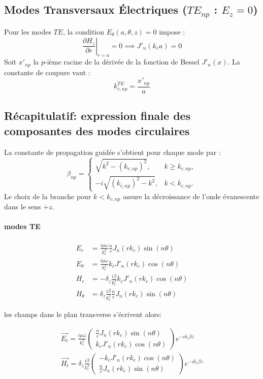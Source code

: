 \documentclass[12pt,a4paper]{report}
\begin{document}
\subsection{Modes Transversaux Électriques ($TE_{np}$ : $E_z = 0$)}
Pour les modes $TE$, la condition $E_\theta(a, \theta, z) = 0$ impose :
\begin{equation}
\left. \frac{\partial H_z}{\partial r} \right|_{r=a} = 0 \implies J'_n(k_c a) = 0
\end{equation}
Soit $x'_{np}$ la $p$-ième racine de la dérivée de la fonction de Bessel $J'_n(x)$. La constante de coupure vaut :
\begin{equation}
k_{c,np}^{TE} = \frac{x'_{np}}{a}
\end{equation}

\subsection{Récapitulatif: expression finale des composantes des modes circulaires}
La constante de propagation guidée s'obtient pour chaque mode par :
\begin{equation}
\beta_{np} =
\begin{cases}
\sqrt{k^2 - (k_{c,np})^2}, & k \ge k_{c,np},\\[2mm]
-i\sqrt{(k_{c,np})^2 - k^2}, & k < k_{c,np}.
\end{cases}
\end{equation}
Le choix de la branche pour $k<k_{c,np}$ assure la décroissance de l'onde évanescente dans le sens $+z$.

\paragraph{modes TE}
\begin{align}
E_r &= \frac{i \mu \omega}{k_c ^ 2} \frac{n}{r} J_n(r k_c)\sin(n \theta) \\
E_\theta &= \frac{i \mu \omega}{k_c ^ 2} k_c J'_n(r k_c)\cos(n \theta) \\
H_r &= - \delta_z \frac{i \beta}{k_c ^ 2} k_c J'_n(r k_c)\cos(n \theta) \\
H_\theta &= \delta_z \frac{i \beta}{k_c ^ 2} \frac{n}{r} J_n(r k_c)\sin(n \theta)
\end{align}

les champs dans le plan transverse s'écrivent alors:

\begin{align}
\vec{E_t} = \frac{i \mu \omega}{k_c ^ 2} \begin{pmatrix} \frac{n}{r} J_n(r k_c)\sin(n \theta) \\ k_c J'_n(r k_c)\cos(n \theta) \end{pmatrix} e^{-i\delta_z\beta z} \\
\vec{H_t} = \delta_z \frac{i \beta}{k_c ^ 2} \begin{pmatrix} -k_c J'_n(r k_c)\cos(n \theta) \\ \frac{n}{r} J_n(r k_c)\sin(n \theta) \end{pmatrix} e^{-i\delta_z\beta z}
\end{align}
\end{document}
